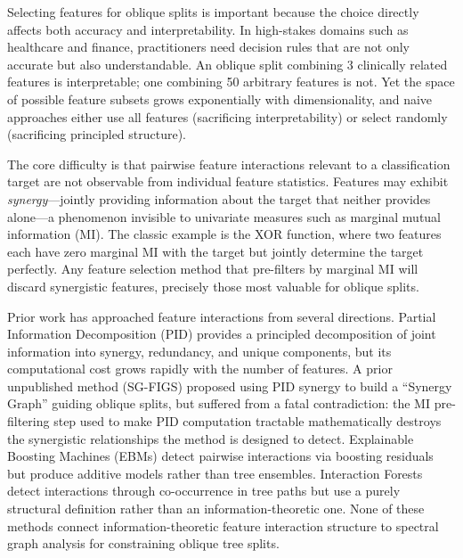 \documentclass[11pt,letterpaper]{article}
\begin{document}
Selecting features for oblique splits is important because the choice directly affects both accuracy and interpretability. In high-stakes domains such as healthcare and finance, practitioners need decision rules that are not only accurate but also understandable. An oblique split combining 3 clinically related features is interpretable; one combining 50 arbitrary features is not. Yet the space of possible feature subsets grows exponentially with dimensionality, and naive approaches either use all features (sacrificing interpretability) or select randomly (sacrificing principled structure).

The core difficulty is that pairwise feature interactions relevant to a classification target are not observable from individual feature statistics. Features may exhibit \emph{synergy}---jointly providing information about the target that neither provides alone---a phenomenon invisible to univariate measures such as marginal mutual information (MI). The classic example is the XOR function, where two features each have zero marginal MI with the target but jointly determine the target perfectly. Any feature selection method that pre-filters by marginal MI will discard synergistic features, precisely those most valuable for oblique splits.

Prior work has approached feature interactions from several directions. Partial Information Decomposition (PID) \citep{Williams2010} provides a principled decomposition of joint information into synergy, redundancy, and unique components, but its computational cost grows rapidly with the number of features. A prior unpublished method (SG-FIGS) proposed using PID synergy to build a ``Synergy Graph'' guiding oblique splits, but suffered from a fatal contradiction: the MI pre-filtering step used to make PID computation tractable mathematically destroys the synergistic relationships the method is designed to detect. Explainable Boosting Machines (EBMs) \citep{Lou2013, Nori2019} detect pairwise interactions via boosting residuals but produce additive models rather than tree ensembles. Interaction Forests \citep{Hornung2022} detect interactions through co-occurrence in tree paths but use a purely structural definition rather than an information-theoretic one. None of these methods connect information-theoretic feature interaction structure to spectral graph analysis for constraining oblique tree splits.
\end{document}
